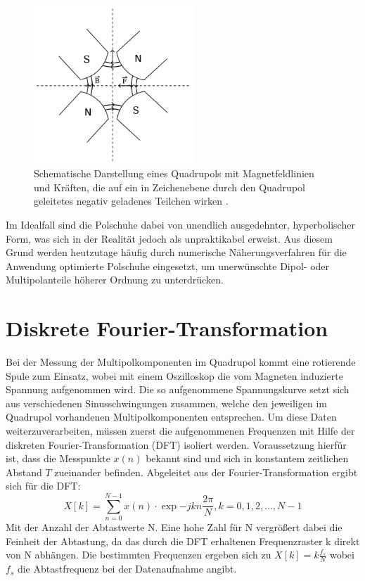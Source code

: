 \documentclass[bigchapter,colorback,accentcolor=tud4b,linedtoc,11pt]{tudreport}
\begin{document}
\begin{figure}[H]
\centering
\includegraphics[width=60mm]{img/quadrupol.png}
\caption{Schematische Darstellung eines Quadrupols mit Magnetfeldlinien und Kräften, die auf ein in Zeichenebene durch den Quadrupol geleitetes negativ geladenes Teilchen wirken \cite{anleitung}.}
\end{figure}

Im Idealfall sind die Polschuhe dabei von unendlich ausgedehnter, hyperbolischer Form, was sich in der Realität jedoch als unpraktikabel erweist. Aus diesem Grund werden heutzutage häufig durch numerische Näherungsverfahren für die Anwendung optimierte Polschuhe eingesetzt, um unerwünschte Dipol- oder Multipolanteile höherer Ordnung zu unterdrücken. 

\section{Diskrete Fourier-Transformation}
Bei der Messung der Multipolkomponenten im Quadrupol kommt eine rotierende Spule zum Einsatz, wobei mit einem Oszilloskop die vom Magneten induzierte Spannung aufgenommen wird. Die so aufgenommene Spannungskurve setzt sich aus verschiedenen Sinusschwingungen zusammen, welche den jeweiligen im Quadrupol vorhandenen Multipolkomponenten entsprechen. Um diese Daten weiterzuverarbeiten, müssen zuerst die aufgenommenen Frequenzen mit Hilfe der diskreten Fourier-Transformation (DFT) isoliert werden. Voraussetzung hierfür ist, dass die Messpunkte $x(n)$ bekannt sind und sich in konstantem zeitlichen Abstand $T$ zueinander befinden. Abgeleitet aus der Fourier-Transformation ergibt sich für die DFT:
$$X[k]= \sum_{n=0}^{N-1} x\left( n \right) \cdot \exp{-jkn \frac{2\pi}{N}}, k = 0, 1, 2, \dots, N-1$$
Mit der Anzahl der Abtastwerte N. Eine hohe Zahl für N vergrößert dabei die Feinheit der Abtastung, da das durch die DFT erhaltenen Frequenzraster k direkt von N abhängen. Die bestimmten Frequenzen ergeben sich zu 
$X[k]=k\frac{f_s}{N}$
wobei $f_s$ die Abtastfrequenz bei der Datenaufnahme angibt.
\end{document}
